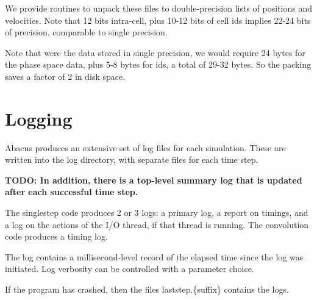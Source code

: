 \documentclass[11pt,preprint]{aastex}
\newcommand{\todo}[1]{{\bf TODO: #1}}
\begin{document}
We provide routines to unpack these files to double-precision lists of
positions and velocities.  Note that 12 bits intra-cell, plus 10-12 bits
of cell ids implies 22-24 bits of precision, comparable to single precision.

Note that were the data stored in single precision, we would require
24 bytes for the phase space data, plus 5-8 bytes for ids, a total of 
29-32 bytes.  So the packing saves a factor of 2 in disk space.

\section{Logging}

Abacus produces an extensive set of log files for each simulation.
These are written into the log directory, with separate files for
each time step. 

\todo{In addition, there is a top-level summary log that is updated
after each successful time step.}

The singlestep code produces 2 or 3 logs: a primary log, a report
on timings, and a log on the actions of the I/O thread, if that
thread is running.  The convolution code produces a timing log.

The log contains a millisecond-level record of the elapsed time
since the log was initiated.  Log verbosity can be controlled with
a parameter choice.

If the program has crashed, then the files laststep.\{suffix\} contains
the logs.
\end{document}
